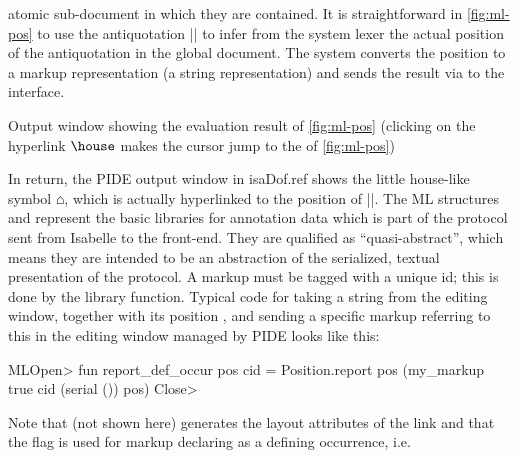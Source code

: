 \begin{isabellebody}
\begin{isamarkuptext}
atomic sub-document in which they are contained. It is straightforward in \autoref{fig:ml-pos} to
use the antiquotation \inlineisar|| to infer from the system lexer the actual position of
the antiquotation in the global document. The system converts the position to a markup
representation (a string representation) and sends the result via  to
the interface.%
\end{isamarkuptext}\isamarkuptrue%
%
\begin{isamarkupfigure*}%
[label = {hyplinkout},type = {Isa_COL.figure}, args={label = {hyplinkout},type = {Isa_COL.figure}, Isa_COL.figure.relative_width = {40}, Isa_COL.figure.src = {figures/markup-demo}, Isa_COL.figure.spawn_columns = {True}}]Output window showing the evaluation result of \autoref{fig:ml-pos} (clicking on the hyperlink $\protect\house$ makes the cursor jump to the  of \autoref{fig:ml-pos})%
\end{isamarkupfigure*}\isamarkuptrue%
%
\begin{isamarkuptext}%
In return, the PIDE output window in \csname isaDof.ref shows the little house-like
symbol $\house$, which is actually hyperlinked to the position of \inlineisar||. The ML
structures  and 
represent the basic libraries for annotation data which is part of the protocol sent from Isabelle
to the front-end. They are qualified as ``quasi-abstract'', which means they are intended to be an
abstraction of the serialized, textual presentation of the protocol. A markup must be tagged with a
unique id; this is done by the library  function. Typical code for taking
a string  from the editing window, together with its position
, and sending a specific markup referring to this in the editing window
managed by PIDE looks like this:
\begin{isar}
ML\<Open> fun report_def_occur pos cid = Position.report pos (my_markup true cid (serial ()) pos) \<Close>
\end{isar}
Note that  (not shown here) generates the layout attributes of the link and 
that the  flag is used for markup declaring  as a defining occurrence, i.e. 

\end{isamarkuptext}
\end{isabellebody}
